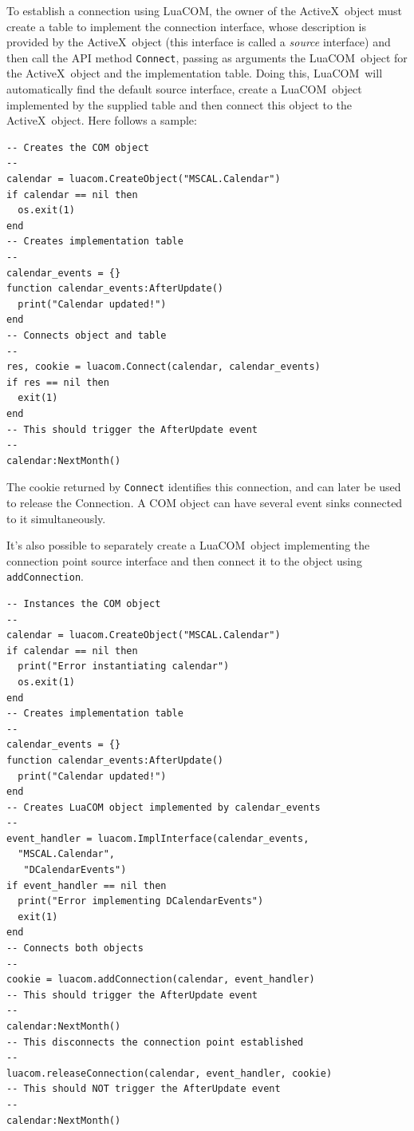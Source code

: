 \documentclass[11pt,a4paper,english]{report}
\newcommand{\techname}[1]{\mbox{#1}}
\newcommand{\activex}{\techname{ActiveX}}
\newcommand{\luacom}{\techname{LuaCOM}}
\begin{document}
  To establish a connection using \luacom, the owner of the \activex\ object
  must create a table to implement the connection interface,
  whose description is provided by the \activex\ object (this interface
  is called a \emph{source} interface) and then call the API method
  \verb+Connect+, passing as arguments the \luacom\ object
  for the \activex\ object and the implementation table. Doing this,
  \luacom\ will automatically find the default source interface, create
  a \luacom\ object implemented by the supplied table and then connect
  this object to the \activex\ object. Here follows a sample:


\begin{verbatim}
-- Creates the COM object
--
calendar = luacom.CreateObject("MSCAL.Calendar")
if calendar == nil then
  os.exit(1)
end
-- Creates implementation table
--
calendar_events = {}
function calendar_events:AfterUpdate()
  print("Calendar updated!")
end
-- Connects object and table
--
res, cookie = luacom.Connect(calendar, calendar_events)
if res == nil then
  exit(1)
end
-- This should trigger the AfterUpdate event
--
calendar:NextMonth()
\end{verbatim}

  The cookie returned by \verb+Connect+ identifies this connection, and can
  later be used to release the Connection. A COM object can have several event
  sinks connected to it simultaneously.

  It's also possible to separately create a \luacom\ object implementing the
  connection point source interface and then connect it to the object using
  \verb+addConnection+.

\begin{verbatim}
-- Instances the COM object
--
calendar = luacom.CreateObject("MSCAL.Calendar")
if calendar == nil then
  print("Error instantiating calendar")
  os.exit(1)
end
-- Creates implementation table
--
calendar_events = {}
function calendar_events:AfterUpdate()
  print("Calendar updated!")
end
-- Creates LuaCOM object implemented by calendar_events
--
event_handler = luacom.ImplInterface(calendar_events,
  "MSCAL.Calendar",
   "DCalendarEvents")
if event_handler == nil then
  print("Error implementing DCalendarEvents")
  exit(1)
end
-- Connects both objects
--
cookie = luacom.addConnection(calendar, event_handler)
-- This should trigger the AfterUpdate event
--
calendar:NextMonth()
-- This disconnects the connection point established
--
luacom.releaseConnection(calendar, event_handler, cookie)
-- This should NOT trigger the AfterUpdate event
--
calendar:NextMonth()
\end{verbatim}
\end{document}
